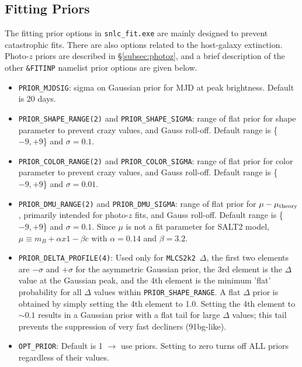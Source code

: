 \documentclass[12pt]{article}
\newcommand{\mlcs}{{\tt MLCS2k2}}
\begin{document}
   \subsection{Fitting Priors}
   \label{subsec:priors}

The fitting prior options in {\tt snlc\_fit.exe} are mainly 
designed to prevent catastrophic fits. There are also
options related to the host-galaxy extinction.
Photo-$z$ priors are described in \S\ref{subsec:photoz},
and a brief description of the other {\tt \&FITINP}
namelist prior options are given below.
%
\begin{itemize}  
  \item \verb|PRIOR_MJDSIG|:
    sigma on Gaussian prior for MJD at peak brightness.
    Default is 20 days.
%
  \item \verb|PRIOR_SHAPE_RANGE(2)|  and \verb|PRIOR_SHAPE_SIGMA|: 
    range of flat prior for shape parameter to prevent crazy values,
    and Gauss roll-off. Default range is \{$-9,+9$\} and $\sigma=0.1$.
%
  \item \verb|PRIOR_COLOR_RANGE(2)|  and \verb|PRIOR_COLOR_SIGMA|: 
    range of flat prior for color parameter to prevent crazy values,
    and Gauss roll-off. Default range is \{$-9,+9$\} and $\sigma=0.01$.
%
  \item \verb|PRIOR_DMU_RANGE(2)|  and \verb|PRIOR_DMU_SIGMA|: 
    range of flat prior for $\mu-\mu_{\rm theory}$, primarily intended for photo-$z$ fits,
    and Gauss roll-off. Default range is \{$-9,+9$\} and $\sigma=0.1$.
    Since $\mu$ is not a fit parameter for SALT2 model,
    $\mu \equiv m_B + \alpha x1 - \beta c$ with  $\alpha=0.14$ and $\beta=3.2$.
%
  \item \verb|PRIOR_DELTA_PROFILE(4)|:
    Used only for \mlcs\ $\Delta$,  
    the first two elements are $-\sigma$ and $+\sigma$
    for the asymmetric Gaussian prior, the 3rd element is
    the $\Delta$ value at the Gaussian peak,
    and the 4th element is the minimum 'flat'  probability
    for all $\Delta$ values within \verb|PRIOR_SHAPE_RANGE|.
    A flat $\Delta$ prior is obtained by simply setting the 
    4th element to 1.0. Setting the 4th element to $\sim 0.1$
    results in a Gaussian prior with a flat tail for large 
    $\Delta$ values; this tail prevents the suppression of
    very fast decliners (91bg-like).
%
  \item \verb|OPT_PRIOR|: Default is 1 $\to$ use priors.
    Setting to zero turns off ALL priors regardless of their values.

\end{itemize}
\end{document}
